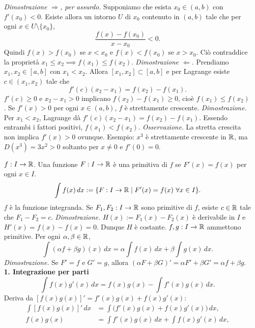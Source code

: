 \textit{Dimostrazione $\Rightarrow$, per assurdo.} Supponiamo che esista $x_0\in(a,b)$ con $f'(x_0)<0$.
Esiste allora un intorno $U$ di $x_0$ contenuto in $(a,b)$ tale che per ogni $x\in U\setminus\{x_0\}$,
\[\frac{f(x)-f(x_0)}{x-x_0}<0.\]
Quindi $f(x)>f(x_0)$ se $x<x_0$ e $f(x)<f(x_0)$ se $x>x_0$. Ciò contraddice la proprietà $x_1\le x_2\implies f(x_1)\le f(x_2)$.
\textit{Dimostrazione $\Leftarrow$.} Prendiamo $x_1,x_2\in[a,b]$ con $x_1<x_2$. Allora $[x_1,x_2]\subset[a,b]$ e per Lagrange esiste $c\in(x_1,x_2)$ tale che
\[f'(c)(x_2-x_1)=f(x_2)-f(x_1).\]
$f'(c)\ge0$ e $x_2-x_1>0$ implicano $f(x_2)-f(x_1)\ge0$, cioè $f(x_1)\le f(x_2)$.
Se $f'(x)>0$ per ogni $x\in(a,b)$, $f$ è strettamente crescente.
\textit{Dimostrazione.} Per $x_1<x_2$, Lagrange dà $f'(c)(x_2-x_1)=f(x_2)-f(x_1)$. Essendo entrambi i fattori positivi, $f(x_1)<f(x_2)$.
\textit{Osservazione.} La stretta crescita non implica $f'(x)>0$ ovunque.
Esempio: $x^3$ è strettamente crescente in $\mathbb R$, ma $D(x^3)=3x^2>0$ soltanto per $x\ne0$ e $f'(0)=0$.
\begin{center}\end{center}
$f:I\to\mathbb R$. Una funzione $F:I\to\mathbb R$ è una primitiva di $f$ se $F'(x)=f(x)$ per ogni $x\in I$.
\[\int f(x)\,dx:=\{F:I\to\R\mid F'(x)=f(x)\ \forall x\in I\}.\]
$f$ è la funzione integranda.
Se $F_1,F_2:I\to\mathbb R$ sono primitive di $f$, esiste $c\in\mathbb R$ tale che $F_1-F_2=c$.
\textit{Dimostrazione.} $H(x):=F_1(x)-F_2(x)$ è derivabile in $I$ e $H'(x)=f(x)-f(x)=0$. Dunque $H$ è costante.
$f,g:I\to\mathbb R$ ammettono primitive. Per ogni $\alpha,\beta\in\mathbb R$,
\[\int(\alpha f+\beta g)(x)\,dx=\alpha\int f(x)\,dx+\beta\int g(x)\,dx.\]
\textit{Dimostrazione.} Se $F'=f$ e $G'=g$, allora $(\alpha F+\beta G)'=\alpha F'+\beta G'=\alpha f+\beta g$.
\textbf{1. Integrazione per parti}
\[\int f(x)g'(x)\,dx=f(x)g(x)-\int f'(x)g(x)\,dx.\]
Deriva da $[f(x)g(x)]'=f'(x)g(x)+f(x)g'(x)$:
\begin{align*}
\int[f(x)g(x)]'\,dx&=\int\bigl(f'(x)g(x)+f(x)g'(x)\bigr)\,dx,\\
f(x)g(x)&=\int f'(x)g(x)\,dx+\int f(x)g'(x)\,dx,
\end{align*}
